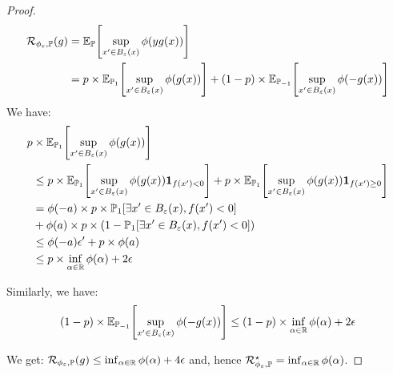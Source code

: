 \begin{proof}
\begin{align*}
\risk_{\phi_\varepsilon,\PP}(g) &= \EE_\PP\left[\sup_{x'\in B_\varepsilon(x)}\phi(yg(x))\right]\\
&=p\times\EE_{\PP_1}\left[\sup_{x'\in B_\varepsilon(x)}\phi(g(x))\right] +(1-p)\times\EE_{\PP_{-1}}\left[\sup_{x'\in B_\varepsilon(x)}\phi(-g(x))\right]
\end{align*}
We have:
\begin{align*}
    p&\times\EE_{\PP_1}\left[\sup_{x'\in B_\varepsilon(x)}\phi(g(x))\right]
    \\
    &\leq p\times\EE_{\PP_1}\left[\sup_{x'\in B_\varepsilon(x)}\phi(g(x))\mathbf{1}_{f(x')<0}\right]+p\times\EE_{\PP_1}\left[\sup_{x'\in B_\varepsilon(x)}\phi(g(x))\mathbf{1}_{f(x')\geq 0}\right] \\
    &=\phi(-a)\times p\times \PP_1\left[\exists x'\in B_\varepsilon(x), f(x')<0\right] \\
    &+ \phi(a)\times p\times\left(1- \PP_1\left[\exists x'\in B_\varepsilon(x), f(x')<0\right]\right)\\
    &\leq\phi(-a) \epsilon'+p\times\phi(a)\\
    &\leq p\times\inf_{\alpha\in\RR}\phi(\alpha) + 2\epsilon
\end{align*}

Similarly, we have:
\begin{align*}
(1-p)\times\EE_{\PP_{-1}}\left[\sup_{x'\in B_\varepsilon(x)}\phi(-g(x))\right] \leq(1-p)\times\inf_{\alpha\in\RR}\phi(\alpha)+2\epsilon
\end{align*}

We get: $\mathcal{R}_{\phi_\varepsilon,\mathbb{P}}(g)\leq \inf_{\alpha\in\mathbb{R}}\phi(\alpha)+4\epsilon$ and, hence $\mathcal{R}^\star_{\phi_\varepsilon,\mathbb{P}}=\inf_{\alpha\in\mathbb{R}}\phi(\alpha)$.
\end{proof}



